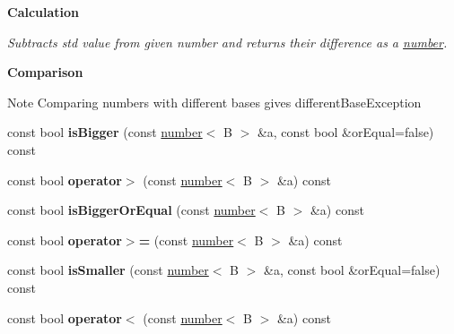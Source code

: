 \begin{Indent}{\bf Calculation}
\begin{DoxyCompactItemize}
\begin{DoxyCompactList}\small\item\em Subtracts std value from given number and returns their difference as a \hyperlink{classcjr_1_1number}{number}. \end{DoxyCompactList}\end{DoxyCompactItemize}
\end{Indent}
\begin{Indent}{\bf Comparison}\par
{\em \begin{DoxyNote}{Note}
Comparing numbers with different bases gives different\-Base\-Exception 
\end{DoxyNote}
}\begin{DoxyCompactItemize}
\item 
\hypertarget{classcjr_1_1number_a16ba1ce1e338fce48151a39ded8b7474}{const bool {\bfseries is\-Bigger} (const \hyperlink{classcjr_1_1number}{number}$<$ B $>$ \&a, const bool \&or\-Equal=false) const }\label{classcjr_1_1number_a16ba1ce1e338fce48151a39ded8b7474}

\item 
\hypertarget{classcjr_1_1number_a1f8bdacbaf1f13628d0d05c0bc2d216a}{const bool {\bfseries operator$>$} (const \hyperlink{classcjr_1_1number}{number}$<$ B $>$ \&a) const }\label{classcjr_1_1number_a1f8bdacbaf1f13628d0d05c0bc2d216a}

\item 
\hypertarget{classcjr_1_1number_a409317d22923aec056b3278e844d1211}{const bool {\bfseries is\-Bigger\-Or\-Equal} (const \hyperlink{classcjr_1_1number}{number}$<$ B $>$ \&a) const }\label{classcjr_1_1number_a409317d22923aec056b3278e844d1211}

\item 
\hypertarget{classcjr_1_1number_a920c71c3a23745c99b5f80cb789cd028}{const bool {\bfseries operator$>$=} (const \hyperlink{classcjr_1_1number}{number}$<$ B $>$ \&a) const }\label{classcjr_1_1number_a920c71c3a23745c99b5f80cb789cd028}

\item 
\hypertarget{classcjr_1_1number_a5cf22a07813460edd061753af8089ca4}{const bool {\bfseries is\-Smaller} (const \hyperlink{classcjr_1_1number}{number}$<$ B $>$ \&a, const bool \&or\-Equal=false) const }\label{classcjr_1_1number_a5cf22a07813460edd061753af8089ca4}

\item 
\hypertarget{classcjr_1_1number_ab3595677812bf4fc5a19e3a7929a91da}{const bool {\bfseries operator$<$} (const \hyperlink{classcjr_1_1number}{number}$<$ B $>$ \&a) const }\label{classcjr_1_1number_ab3595677812bf4fc5a19e3a7929a91da}


\end{DoxyCompactItemize}
\end{Indent}
